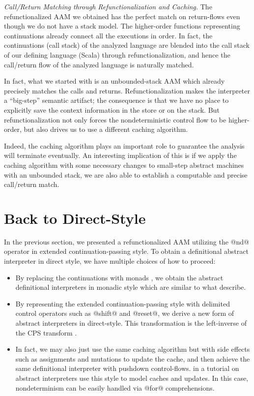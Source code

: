\documentclass[acmsmall, review]{acmart}\settopmatter{}
\begin{document}
\textit{Call/Return Matching through Refunctionalization and Caching.}
The refunctionalized AAM we obtained has the perfect match on return-flows even though
we do not have a stack model. The higher-order functions representing continuations
already connect all the executions in order. In fact, the continuations (call stack)
of the analyzed language are blended into the call stack of our defining language
(Scala) through refunctionalization, and hence the call/return flow of the analyzed 
language is naturally matched.

In fact, what we started with is an unbounded-stack AAM which already precisely
matches the calls and returns. Refunctionalization makes the interpreter a ``big-step''
semantic artifact; the consequence is that we have no place to explicitly save the context
information in the store or on the stack. 
But refunctionalization not only forces the nondeterministic control flow to be higher-order,
but also drives us to use a different caching algorithm.

Indeed, the caching algorithm plays an important role to guarantee the analysis will
terminate eventually.
An interesting implication of this is if we apply the caching algorithm with some 
necessary changes to small-step abstract machines with an unbounded stack, we are 
also able to establish a computable and precise call/return match.

\section{Back to Direct-Style} \label{directstyle}

In the previous section, we presented a refunctionalized AAM utilizing the @nd@ operator
in extended continuation-passing style.
To obtain a definitional abstract interpreter in direct style, we have multiple choices 
of how to proceed:
\begin{itemize}
  \item By replacing the continuations with monads \cite{filinski1994representing}, 
    we obtain the abstract definitional interpreters in monadic style which are similar to what 
    \citet{darais2017abstracting} describe.
  \item By representing the extended continuation-passing style with delimited control operators
    such as @shift@ and @reset@, we derive a new form of abstract interpreters in direct-style.
    This transformation is the left-inverse of the CPS transform \cite{DBLP:journals/scp/Danvy94, DBLP:conf/lfp/DanvyL92}.
  \item In fact, we may also just use the same caching algorithm but with side effects such as
    assignments and mutations to update the cache, and then achieve the same definitional 
    interpreter with pushdown control-flows.  in a tutorial on abstract 
    interpreters use this style to model caches and updates.
    In this case, nondeterminism can be easily handled via @for@ comprehensions. 
\end{itemize}
\end{document}
